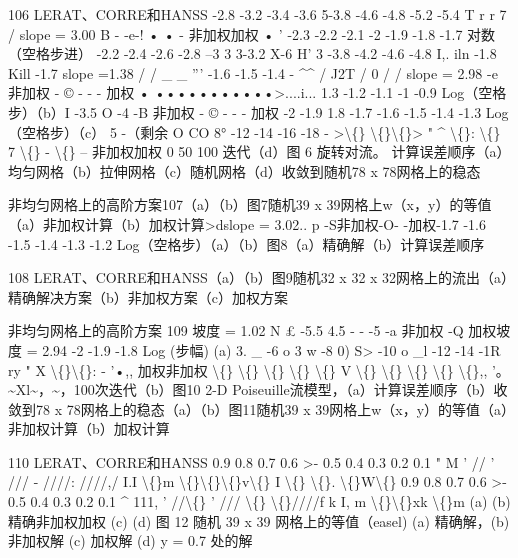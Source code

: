 \documentclass[UTF8,11pt,a4paper,openany,fontset=fandol]{ctexbook}
\begin{document}
106 LERAT、CORRE和HANSS -2.8 -3.2 -3.4 -3.6 5-3.8 -4.6 -4.8 -5.2 -5.4 T r r 7 / slope = 3.00 B - -e-! • • - 非加权加权 • ' -2.3 -2.2 -2.1 -2 -1.9 -1.8 -1.7 对数（空格步进） -2.2 -2.4 -2.6 -2.8 --3 3 3-3.2 X-6 H' 3 -3.8 -4.2 -4.6 -4.8 I,. iln -1.8 Kill -1.7 slope =1.38 / / \_ \_ ''' -1.6 -1.5 -1.4 - \textasciicircum{}\textasciicircum{} / J2T / 0 / / slope = 2.98 -e 非加权 - © - - - 加权 • •••••••••••>....i... 1.3 -1.2 -1.1 -1 -0.9 Log（空格步）（b）I -3.5 O -4 -B 非加权 - © - - - 加权 -2 -1.9 1.8 -1.7 -1.6 -1.5 -1.4 -1.3 Log（空格步）（c） 5 -（剩余 O CO 8° -12 -14 -16 -18 - >\textbackslash\{\} \textbackslash\{\}\textbackslash\{\}> " \textasciicircum{} \textbackslash\{\}: \textbackslash\{\} 7 \textbackslash\{\} - \textbackslash\{\} -- 非加权加权 0 50 100 迭代（d）图 6 旋转对流。 计算误差顺序（a）均匀网格（b）拉伸网格（c）随机网格（d）收敛到随机78 x 78网格上的稳态

非均匀网格上的高阶方案107（a）（b）图7随机39 x 39网格上w（x，y）的等值（a）非加权计算（b）加权计算>dslope = 3.02.. p -S非加权-O- -加权-1.7 -1.6 -1.5 -1.4 -1.3 -1.2 Log（空格步）（a）（b）图8（a）精确解（b）计算误差顺序

108 LERAT、CORRE和HANSS（a）（b）图9随机32 x 32 x 32网格上的流出（a）精确解决方案（b）非加权方案（c）加权方案

非均匀网格上的高阶方案 109 坡度 = 1.02 N £ -5.5 4.5 - - -5 -a 非加权 -Q 加权坡度 = 2.94 -2 -1.9 -1.8 Log (步幅) (a) 3. \_ -6 o 3 w -8 0) S> -10 o \_l -12 -14 -1R ry " X \textbackslash\{\}\textbackslash\{\}: - '•,, 加权非加权 \textbackslash\{\} \textbackslash\{\} \textbackslash\{\} \textbackslash\{\} \textbackslash\{\} V \textbackslash\{\} \textbackslash\{\} \textbackslash\{\} \textbackslash\{\} \textbackslash\{\},, '。 \textasciitilde{}Xl\textasciitilde{}，\textasciitilde{}，100次迭代（b）图10 2-D Poiseuille流模型，（a）计算误差顺序（b）收敛到78 x 78网格上的稳态（a）（b）图11随机39 x 39网格上w（x，y）的等值（a）非加权计算（b）加权计算

110 LERAT、CORRE和HANSS 0.9 0.8 0.7 0.6 >- 0.5 0.4 0.3 0.2 0.1 " M ' // ' /// - ////: ////,/ I.I \textbackslash\{\}m \textbackslash\{\}\textbackslash\{\}\textbackslash\{\}v\textbackslash\{\} I \textbackslash\{\} \textbackslash\{\}. \textbackslash\{\}W\textbackslash\{\} 0.9 0.8 0.7 0.6 >- 0.5 0.4 0.3 0.2 0.1 \textasciicircum{} 111, ' //\textbackslash\{\} ' /// \textbackslash\{\} \textbackslash\{\}////f k I, m \textbackslash\{\}\textbackslash\{\}xk \textbackslash\{\}m (a) (b) 精确非加权加权 (c) (d) 图 12 随机 39 x 39 网格上的等值（easel) (a) 精确解，(b) 非加权解 (c) 加权解 (d) y = 0.7 处的解
\end{document}
